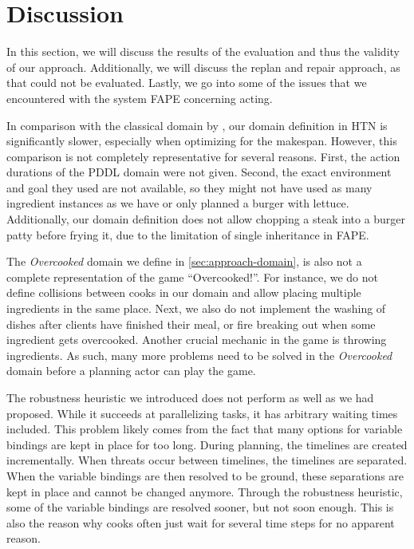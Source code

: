 \section{Discussion}\label{sec:discussion}

In this section, we will discuss the results of the evaluation and thus the validity of our approach.
Additionally, we will discuss the replan and repair approach, as that could not be evaluated. 
Lastly, we go into some of the issues that we encountered with the system \ac{FAPE} concerning acting.

In comparison with the classical domain by \cite{yuxinliuPlanningOvercookedGame2020}, our domain definition in \ac{HTN} is significantly slower, especially when optimizing for the makespan.
However, this comparison is not completely representative for several reasons.
First, the action durations of the \ac{PDDL} domain were not given.
Second, the exact environment and goal they used are not available, so they might not have used as many ingredient instances as we have or only planned a burger with lettuce.
Additionally, our domain definition does not allow chopping a steak into a burger patty before frying it, due to the limitation of single inheritance in \ac{FAPE}.

The \textit{Overcooked} domain we define in \ref{sec:approach-domain}, is also not a complete representation of the game ``Overcooked!''.
For instance, we do not define collisions between cooks in our domain and allow placing multiple ingredients in the same place.
Next, we also do not implement the washing of dishes after clients have finished their meal, or fire breaking out when some ingredient gets overcooked.
Another crucial mechanic in the game is throwing ingredients.
As such, many more problems need to be solved in the \textit{Overcooked} domain before a planning actor can play the game.

The robustness heuristic we introduced does not perform as well as we had proposed.
While it succeeds at parallelizing tasks, it has arbitrary waiting times included.
This problem likely comes from the fact that many options for variable bindings are kept in place for too long.
During planning, the timelines are created incrementally.
When threats occur between timelines, the timelines are separated.
When the variable bindings are then resolved to be ground, these separations are kept in place and cannot be changed anymore.
Through the robustness heuristic, some of the variable bindings are resolved sooner, but not soon enough.
This is also the reason why cooks often just wait for several time steps for no apparent reason.

